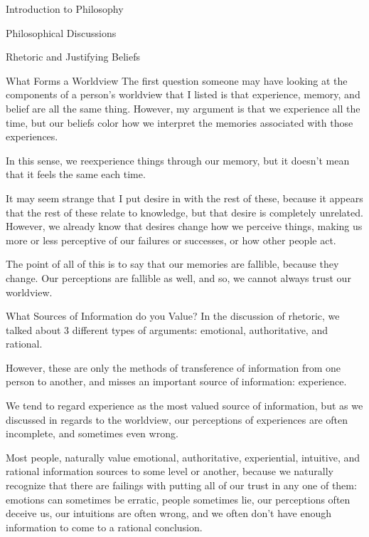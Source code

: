 \begin{chapter}{Introduction to Philosophy}
\begin{section}{Philosophical Discussions}
\begin{subsection}{Rhetoric and Justifying Beliefs}
\begin{subsubsection}{What Forms a Worldview}
                The first question someone may have looking at the components of a person's worldview that I listed is that experience, memory, and belief are all the same thing. However, my argument is that we experience all the time, but our beliefs color how we interpret the memories associated with those experiences.
                    
                In this sense, we reexperience things through our memory, but it doesn't mean that it feels the same each time.
                    
                It may seem strange that I put desire in with the rest of these, because it appears that the rest of these relate to knowledge, but that desire is completely unrelated. However, we already know that desires change how we perceive things, making us more or less perceptive of our failures or successes, or how other people act.
                    
                The point of all of this is to say that our memories are fallible, because they change. Our perceptions are fallible as well, and so, we cannot always trust our worldview.
            \end{subsubsection}
                
            \begin{subsubsection}{What Sources of Information do you Value?}
                In the discussion of rhetoric, we talked about 3 different types of arguments: emotional, authoritative, and rational.
                    
                However, these are only the methods of transference of information from one person to another, and misses an important source of information: experience.
                    
                We tend to regard experience as the most valued source of information, but as we discussed in regards to the worldview, our perceptions of experiences are often incomplete, and sometimes even wrong.
                    
                Most people, naturally value emotional, authoritative, experiential, intuitive, and rational information sources to some level or another, because we naturally recognize that there are failings with putting all of our trust in any one of them: emotions can sometimes be erratic, people sometimes lie, our perceptions often deceive us, our intuitions are often wrong, and we often don't have enough information to come to a rational conclusion.
                    

\end{subsubsection}
\end{subsection}
\end{section}
\end{chapter}

